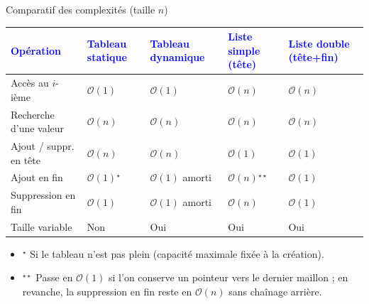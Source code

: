 \documentclass[10pt]{beamer}
\begin{document}
\begin{frame}{\Ctitle}{\stitle}
	\begin{block}{Comparatif des complexités (taille $n$)}
		\renewcommand{\arraystretch}{1.25}
		\begin{tabularx}{\textwidth}{|>{\scriptsize}l|>{\scriptsize}Y|>{\scriptsize}Y|>{\scriptsize}Y|>{\scriptsize}Y|}
			\hline
			\textcolor{blue}{\textbf{Opération}} & \textcolor{blue}{\textbf{Tableau statique}} & \textcolor{blue}{\textbf{Tableau dynamique}} & \textcolor{blue}{\textbf{Liste simple} (tête)} & \textcolor{blue}{\textbf{Liste double} (tête+fin)} \\
			\hline
			Accès au $i$-ième & \textcolor{OliveGreen}{$\mathcal{O}(1)$} & \textcolor{OliveGreen}{$\mathcal{O}(1)$} & \textcolor{BrickRed}{$\mathcal{O}(n)$} & \textcolor{BrickRed}{$\mathcal{O}(n)$} \\
			\hline
			Recherche d'une valeur & \textcolor{BrickRed}{$\mathcal{O}(n)$} & \textcolor{BrickRed}{$\mathcal{O}(n)$} & \textcolor{BrickRed}{$\mathcal{O}(n)$} & \textcolor{BrickRed}{$\mathcal{O}(n)$} \\
			\hline
			Ajout / suppr. en tête & \textcolor{BrickRed}{$\mathcal{O}(n)$} & \textcolor{BrickRed}{$\mathcal{O}(n)$} & \textcolor{OliveGreen}{$\mathcal{O}(1)$} & \textcolor{OliveGreen}{$\mathcal{O}(1)$} \\
			\hline
			Ajout en fin & \textcolor{OliveGreen}{$\mathcal{O}(1)$}$^\star$ & \textcolor{OliveGreen}{$\mathcal{O}(1)$} amorti & \textcolor{BrickRed}{$\mathcal{O}(n)$}$^{\star\star}$ & \textcolor{OliveGreen}{$\mathcal{O}(1)$} \\
			\hline
			Suppression en fin & \textcolor{OliveGreen}{$\mathcal{O}(1)$} & \textcolor{OliveGreen}{$\mathcal{O}(1)$} amorti & \textcolor{BrickRed}{$\mathcal{O}(n)$} & \textcolor{OliveGreen}{$\mathcal{O}(1)$} \\
			\hline
			Taille variable & Non & Oui & Oui & Oui \\
			\hline
		\end{tabularx}
		\vspace{0.2cm}
		\begin{itemize}
			\item<2-> {\footnotesize $^\star$ Si le tableau n'est pas plein (capacité maximale fixée à la création).}
			\item<3-> {\footnotesize $^{\star\star}$ Passe en $\mathcal{O}(1)$ si l'on conserve un pointeur vers le dernier maillon ; en revanche, la suppression en fin reste en $\mathcal{O}(n)$ sans chaînage arrière.}
		\end{itemize}
	\end{block}
\end{frame}
\end{document}
